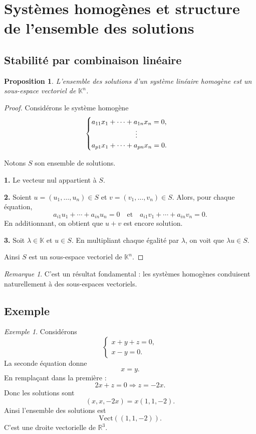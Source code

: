 \documentclass[11pt,a4paper]{article}
\newtheorem{proposition}[definition]{Proposition}
\theoremstyle{remark}
\newtheorem{remarque}[definition]{Remarque}
\newtheorem{exemple}[definition]{Exemple}
\newcommand{\R}{\mathbb{R}}
\newcommand{\K}{\mathbb{K}}
\newcommand{\Vect}{\mathrm{Vect}}
\begin{document}
\section{Systèmes homogènes et structure de l’ensemble des solutions}

\subsection{Stabilité par combinaison linéaire}

\begin{proposition}
L’ensemble des solutions d’un système linéaire homogène est un sous-espace vectoriel de \(\K^n\).
\end{proposition}

\begin{proof}
Considérons le système homogène
\[
\begin{cases}
a_{11}x_1+\cdots+a_{1n}x_n=0,\\
\hspace{2.2cm}\vdots\\
a_{p1}x_1+\cdots+a_{pn}x_n=0.
\end{cases}
\]

Notons \(S\) son ensemble de solutions.

\textbf{1.} Le vecteur nul appartient à \(S\).

\textbf{2.} Soient \(u=(u_1,\dots,u_n)\in S\) et \(v=(v_1,\dots,v_n)\in S\). Alors, pour chaque équation,
\[
a_{i1}u_1+\cdots+a_{in}u_n=0
\quad \text{et} \quad
a_{i1}v_1+\cdots+a_{in}v_n=0.
\]
En additionnant, on obtient que \(u+v\) est encore solution.

\textbf{3.} Soit \(\lambda\in\K\) et \(u\in S\). En multipliant chaque égalité par \(\lambda\), on voit que \(\lambda u\in S\).

Ainsi \(S\) est un sous-espace vectoriel de \(\K^n\).
\end{proof}

\begin{remarque}
C’est un résultat fondamental : les systèmes homogènes conduisent naturellement à des sous-espaces vectoriels.
\end{remarque}

\subsection{Exemple}

\begin{exemple}
Considérons
\[
\begin{cases}
x+y+z=0,\\
x-y=0.
\end{cases}
\]
La seconde équation donne
\[
x=y.
\]
En remplaçant dans la première :
\[
2x+z=0 \Longrightarrow z=-2x.
\]
Donc les solutions sont
\[
(x,x,-2x)=x(1,1,-2).
\]
Ainsi l’ensemble des solutions est
\[
\Vect((1,1,-2)).
\]
C’est une droite vectorielle de \(\R^3\).
\end{exemple}
\end{document}
